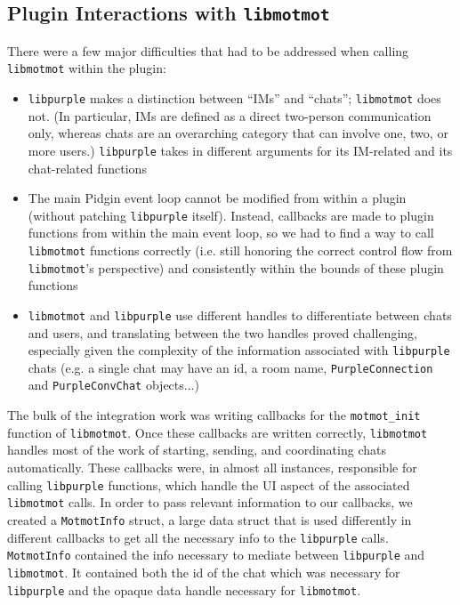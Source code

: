 \documentclass{sig-alternate}
\newcommand\libmotmot{\texttt{libmotmot}\xspace}
\newcommand\libpurple{\texttt{libpurple}\xspace}
\begin{document}
\subsection{Plugin Interactions with \libmotmot}
There were a few major difficulties that had to be addressed when calling
\libmotmot within the plugin:

\begin{itemize}
\item \libpurple makes a distinction between ``IMs'' and
``chats''; \libmotmot does not.  (In particular, IMs are defined as a direct two-person communication only, whereas chats are an overarching category that can involve one, two, or more users.) \libpurple takes in
different arguments for its IM-related and its chat-related functions

\item The main Pidgin event loop cannot be modified from within a plugin
(without patching \libpurple itself).  Instead, callbacks are made to plugin
functions from within the main event loop, so we had to find a way to call
\libmotmot functions correctly (i.e. still honoring the correct control flow
from \libmotmot's perspective) and consistently within the bounds of these
plugin functions

\item \libmotmot and \libpurple use different handles to differentiate between
chats and users, and translating between the two handles proved challenging,
especially given the complexity of the information associated with \libpurple
chats (e.g. a single chat may have an id, a room name, \verb`PurpleConnection`
and \verb`PurpleConvChat` objects...)

\end{itemize}

The bulk of the integration work was writing callbacks for the
\verb`motmot_init` function of \libmotmot.  Once these callbacks are written
correctly, \libmotmot handles most of the work of starting, sending, and
coordinating chats automatically.  These callbacks were, in almost all
instances, responsible for calling \libpurple functions, which handle the UI
aspect of the associated \libmotmot calls.  In order to pass relevant
information to our callbacks, we created a \verb`MotmotInfo` struct, a large
data struct that is used differently in different callbacks to get all the
necessary info to the \libpurple calls. \verb`MotmotInfo` contained the info
necessary to mediate between \libpurple and \libmotmot. It contained both the
id of the chat which was necessary for \libpurple and the opaque data handle
necessary for \libmotmot.
\end{document}
